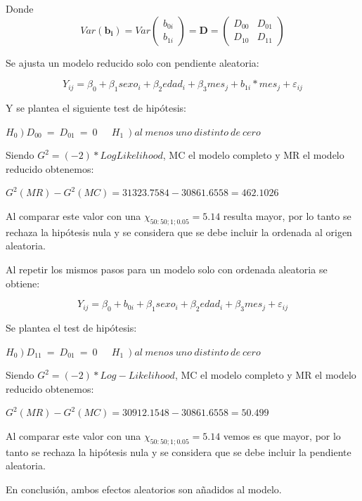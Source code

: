 \documentclass[spanish]{article}
\numberwithin{figure}{subsection}
\numberwithin{equation}{subsection}
\numberwithin{table}{subsection}
\begin{document}
Donde \[
	Var(\bm{b_i}) = Var\begin{pmatrix} b_{0i} \\ b_{1i} \end{pmatrix}
	= \bm{D} = \begin{pmatrix} D_{00} & D_{01} \\ D_{10} & D_{11} \end{pmatrix}
\]

Se ajusta un modelo reducido solo con pendiente aleatoria:

\[
	Y_{ij} = \beta_0 + \beta_1 sexo_i + \beta_2 edad_i
	+ \beta_3 mes_j + b_{1i}*mes_j + \varepsilon_{ij}
\]

Y se plantea el siguiente test de hipótesis:

$ \left. H_0 \right) D_{00}\ =\ D_{01}\ =\ 0\ \quad\ \left. H_1\ \right) al\ menos\ uno\ distinto\ de\ cero $

Siendo $G^2 = (-2)*LogLikelihood$, MC el modelo completo y MR el modelo
reducido obtenemos:

$ G^2(MR) - G^2(MC) = 31323.7584 - 30861.6558 = 462.1026 $

Al comparar este valor con una $\chi_{50:50;1;0.05} = 5.14$ resulta mayor, por
lo tanto se rechaza la hipótesis nula y se considera que se debe incluir la
ordenada al origen aleatoria.

Al repetir los mismos pasos para un modelo solo con ordenada aleatoria se
obtiene:

\[
	Y_{ij} = \beta_0 + b_{0i} + \beta_1 sexo_i + \beta_2 edad_i
	+ \beta_3 mes_j + \varepsilon_{ij}
\]

Se plantea el test de hipótesis:

$ \left. H_0 \right) D_{11}\ =\ D_{01}\ =\ 0\ \quad\ \left. H_1\ \right) al\ menos\ uno\ distinto\ de\ cero $

Siendo $G^2 = (-2)*Log-Likelihood$, MC el modelo completo y MR el modelo
reducido obtenemos:

$ G^2(MR) - G^2(MC) = 30912.1548 - 30861.6558 = 50.499 $

Al comparar este valor con una $\chi_{50:50;1;0.05} = 5.14$ vemos es que mayor,
por lo tanto se rechaza la hipótesis nula y se considera que se debe incluir la
pendiente aleatoria.

En conclusión, ambos efectos aleatorios son añadidos al modelo.

\newpage
\nocite{*}
\renewcommand{\refname}{Bibliografía}

\end{document}
